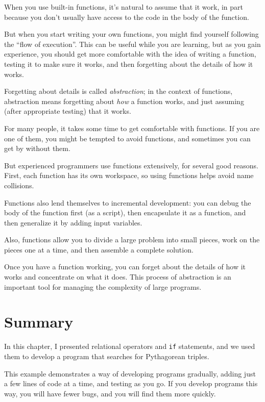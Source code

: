 When you use built-in functions, it's natural to assume that it work, in part because you don't
usually have access to the code in the body of the function.

But when you start writing your own functions, you might
find yourself following the ``flow of execution''.  This can
be useful while you are learning, but as you gain experience, you
should get more comfortable with the idea of writing a function,
testing it to make sure it works, and then forgetting about the
details of how it works.


Forgetting about details is called {\em abstraction}; in the context
of functions, abstraction means forgetting about {\em how} a function
works, and just assuming (after appropriate testing) that it works.

For many people, it takes some time to get comfortable with functions.  If you are one of them, you might be tempted to avoid functions, and sometimes you can get by without them.

But experienced programmers use functions extensively, for several good reasons. First, each function has its own workspace, so using functions helps
avoid name collisions. 

Functions also lend themselves to incremental development: you can
debug the body of the function first (as a script), then encapsulate
it as a function, and then generalize it by adding input variables.

Also, functions allow you to divide a large problem into small
pieces, work on the pieces one at a time, and then assemble a
complete solution. 

Once you have a function working, you can forget about the
details of how it works and concentrate on what it does.  This
process of abstraction is an important tool for managing the
complexity of large programs.


\section{Summary}

In this chapter, I presented relational operators and {\tt if} statements, and we used them to develop a program that searches for Pythagorean triples.

This example demonstrates a way of developing programs gradually, adding just a few lines of code at a time, and testing as you go.  If you develop programs this way, you will have fewer bugs, and you will find them more quickly.


